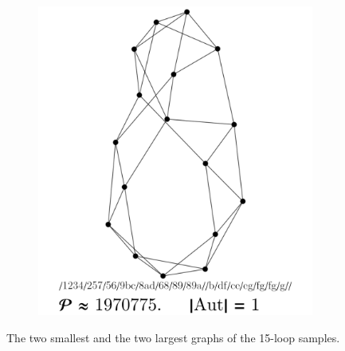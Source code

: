 \documentclass[11pt,a4paper]{article}
\renewcommand{\|}{\rule[-0.4ex]{0.2ex}{1.2em}}
\begin{document}
\begin{figure}[htb]
\begin{subfigure}[b]{.24 \textwidth}
		\subcaption{}
	\end{subfigure}
	\begin{subfigure}[b]{.24 \textwidth}
		\includegraphics[width=\linewidth]{largest_15_1}
		\subcaption{}
	\end{subfigure}
	
	\caption{The two smallest and the two largest graphs of the 15-loop samples.}
	\label{smallest_15}
\end{figure}
\end{document}
